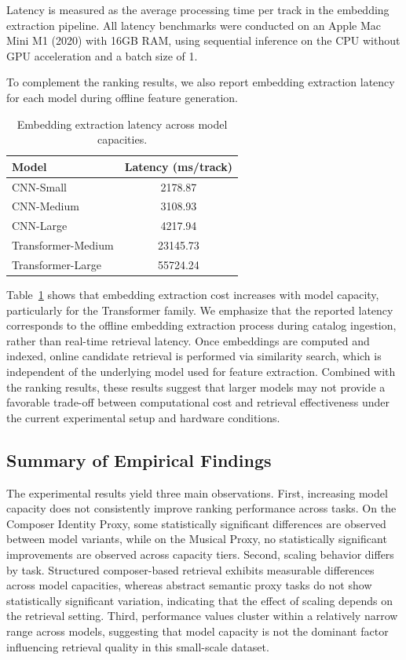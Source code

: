 \documentclass[sigconf]{acmart}
\begin{document}
Latency is measured as the average processing time per track in the embedding extraction pipeline. 
All latency benchmarks were conducted on an Apple Mac Mini M1 (2020) with 16GB RAM, using sequential inference on the CPU without GPU acceleration and a batch size of 1.

To complement the ranking results, we also report embedding extraction latency for each model during offline feature generation.

\begin{table}[!htbp]
\centering
\caption{Embedding extraction latency across model capacities.}
\label{tab:latency_results}
\begin{tabular}{lc}
\hline
\textbf{Model} & \textbf{Latency (ms/track)} \\
\hline
CNN-Small & 2178.87 \\
CNN-Medium & 3108.93 \\
CNN-Large & 4217.94 \\
Transformer-Medium & 23145.73 \\
Transformer-Large & 55724.24 \\
\hline
\end{tabular}
\end{table}

Table~\ref{tab:latency_results} shows that embedding extraction cost increases with model capacity, particularly for the Transformer family. We emphasize that the reported latency corresponds to the offline embedding extraction process during catalog ingestion, rather than real-time retrieval latency. Once embeddings are computed and indexed, online candidate retrieval is performed via similarity search, which is independent of the underlying model used for feature extraction. Combined with the ranking results, these results suggest that larger models may not provide a favorable trade-off between computational cost and retrieval effectiveness under the current experimental setup and hardware conditions.


\subsection{Summary of Empirical Findings}

The experimental results yield three main observations. First, increasing model capacity does not consistently improve ranking performance across tasks. On the Composer Identity Proxy, some statistically significant differences are observed between model variants, while on the Musical Proxy, no statistically significant improvements are observed across capacity tiers. Second, scaling behavior differs by task. Structured composer-based retrieval exhibits measurable differences across model capacities, whereas abstract semantic proxy tasks do not show statistically significant variation, indicating that the effect of scaling depends on the retrieval setting. Third, performance values cluster within a relatively narrow range across models, suggesting that model capacity is not the dominant factor influencing retrieval quality in this small-scale dataset.
\end{document}
